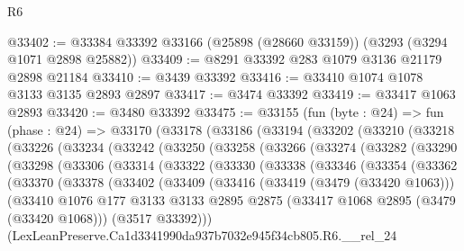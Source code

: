 \begin{lexlean}{R6}
\begin{coremodule}
@33402 := @33384 @33392 @33166 (@25898 (@28660 @33159)) (@3293 (@3294 @1071 @2898 @25882))
@33409 := @8291 @33392 @283 @1079 @3136 @21179 @2898 @21184
@33410 := @3439 @33392
@33416 := @33410 @1074 @1078 @3133 @3135 @2893 @2897
@33417 := @3474 @33392
@33419 := @33417 @1063 @2893
@33420 := @3480 @33392
@33475 := @33155
    (fun (byte : @24) =>
    fun (phase : @24) =>
    @33170
      (@33178
        (@33186
          (@33194
            (@33202
              (@33210
                (@33218
                  (@33226
                    (@33234
                      (@33242
                        (@33250
                          (@33258
                            (@33266
                              (@33274
                                (@33282
                                  (@33290
                                    (@33298
                                      (@33306
                                        (@33314
                                          (@33322
                                            (@33330
                                              (@33338
                                                (@33346
                                                  (@33354
                                                    (@33362
                                                      (@33370
                                                        (@33378
                                                          (@33402
                                                            (@33409
                                                              (@33416
                                                                (@33419 (@3479 (@33420 @1063)))
                                                                (@33410
                                                                  @1076
                                                                  @177
                                                                  @3133
                                                                  @3133
                                                                  @2895
                                                                  @2875
                                                                  (@33417
                                                                    @1068
                                                                    @2895
                                                                    (@3479 (@33420 @1068)))
                                                                  (@3517 @33392)))
                                                              (LexLeanPreserve.Ca1d3341990da937b7032e945f34cb805.R6.__rel_24

\end{coremodule}
\end{lexlean}
